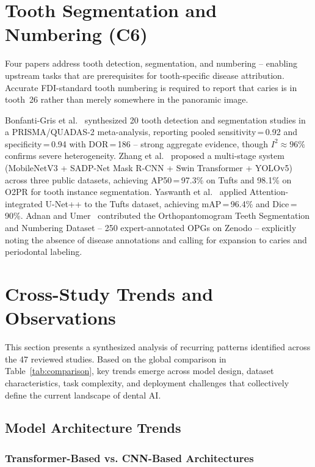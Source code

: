 \documentclass[conference]{IEEEtran}
\begin{document}
\section{Tooth Segmentation and Numbering (C6)}
\label{sec:segmentation}

Four papers address tooth detection, segmentation, and numbering --
enabling upstream tasks that are prerequisites for tooth-specific disease
attribution. Accurate FDI-standard tooth numbering is required to report
that caries is in tooth~26 rather than merely somewhere in the panoramic
image.

Bonfanti-Gris et al.~\cite{bonfanti2025deep} synthesized 20 tooth
detection and segmentation studies in a PRISMA/QUADAS-2 meta-analysis,
reporting pooled sensitivity\,=\,0.92 and specificity\,=\,0.94 with
DOR\,=\,186 -- strong aggregate evidence, though $I^2 \approx 96\%$
confirms severe heterogeneity. Zhang et al.~\cite{zhang2025reliable}
proposed a multi-stage system (MobileNetV3 + SADP-Net Mask R-CNN + Swin
Transformer + YOLOv5) across three public datasets, achieving
AP50\,=\,97.3\% on Tufts and 98.1\% on O2PR for tooth instance
segmentation. Yaswanth et al.~\cite{yaswanth2025automated} applied
Attention-integrated U-Net++ to the Tufts dataset, achieving
mAP\,=\,96.4\% and Dice\,=\,90\%. Adnan and
Umer~\cite{adnan2024orthopantomogram} contributed the Orthopantomogram
Teeth Segmentation and Numbering Dataset -- 250 expert-annotated OPGs on
Zenodo -- explicitly noting the absence of disease annotations and
calling for expansion to caries and periodontal labeling.

\section{Cross-Study Trends and Observations}

This section presents a synthesized analysis of recurring patterns identified across the 47 reviewed studies. Based on the global comparison in Table~\ref{tab:comparison}, key trends emerge across model design, dataset characteristics, task complexity, and deployment challenges that collectively define the current landscape of dental AI.

\subsection{Model Architecture Trends}

\subsubsection{Transformer-Based vs. CNN-Based Architectures}
\end{document}
